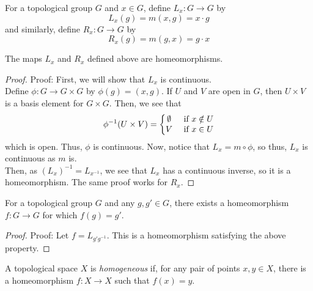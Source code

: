 
\begin{definition}
    For a topological group $G$ and $x \in G$, define $L_{x} : G \to G$ by
    \[ L_{x}(g) = m(x, g) = x \cdot g \]
    and similarly, define $R_{x} : G \to G$ by
    \[ R_{x}(g) = m(g, x) = g \cdot x \]
\end{definition}

\begin{lemma}
    The maps $L_{x}$ and $R_{x}$ defined above are homeomorphisms.
\end{lemma}
\begin{proof}{Proof:}
    First, we will show that $L_{x}$ is continuous.\\
    
    Define $\phi : G \to G \times G$ by $\phi(g) = (x, g)$. If $U$ and $V$ are open in $G$, then $U \times V$ is a basis element for $G \times G$. Then, we see that
    \[ \phi^{-1}(U \times V) = \left\{\begin{matrix} \emptyset & \text{ if } x \notin U \\ V & \tt{ if } x \in U\end{matrix}\right. \]
    which is open. Thus, $\phi$ is continuous. Now, notice that $L_{x} = m \circ \phi$, so thus, $L_{x}$ is continuous as $m$ is.\\

    Then, as $(L_{x})^{-1} = L_{x^{-1}}$, we see that $L_{x}$ has a continuous inverse, so it is a homeomorphism. The same proof works for $R_{x}$. 
\end{proof}

\begin{lemma}
    For a topological group $G$ and any $g, g' \in G$, there exists a homeomorphism $f : G \to G$ for which $f(g) = g'$. 
\end{lemma}
\begin{proof}{Proof:}
    Let $f = L_{g'g^{-1}}$. This is a homeomorphism satisfying the above property. 
\end{proof}

\begin{definition}
    A topological space $X$ is \emph{homogeneous} if, for any pair of points $x, y \in X$, there is a homeomorphism $f : X \to X$ such that $f(x) = y$. 
\end{definition}

